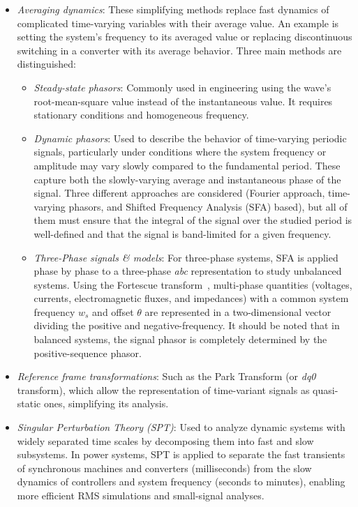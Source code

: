 \begin{itemize}
    \item \textit{Averaging dynamics}: These simplifying methods replace fast dynamics of complicated time-varying variables with their average value. 
    An example is setting the system's frequency to its averaged value or replacing discontinuous switching in a converter with its average behavior. 
    Three main methods are distinguished:
    \begin{itemize}
        \item \textit{Steady-state phasors}: Commonly used in engineering using the wave's root-mean-square value instead of the instantaneous value. 
        It requires stationary conditions and homogeneous frequency.
        \item \textit{Dynamic phasors}: Used to describe the behavior of time-varying periodic signals, particularly under conditions where the system frequency 
        or amplitude may vary slowly compared to the fundamental period. These capture both the slowly-varying average and instantaneous phase of the signal. 
        Three different approaches are considered (Fourier approach, time-varying phasors, and Shifted Frequency Analysis (SFA) based), 
        but all of them must ensure that the integral of the signal over the studied period is well-defined and that the signal is band-limited for a given frequency.
        \item \textit{Three-Phase signals \& models}: For three-phase systems, SFA is applied phase by phase to a three-phase \textit{abc} representation to study unbalanced systems. 
        Using the Fortescue transform~\cite{Fortescue}, multi-phase quantities (voltages, currents, electromagnetic fluxes, and impedances) with a common system frequency $w_s$ 
        and offset $\theta$ are represented in a two-dimensional vector dividing the positive and negative-frequency. 
        It should be noted that in balanced systems, the signal phasor is completely determined by the positive-sequence phasor.
    \end{itemize}

    \item \textit{Reference frame transformations}: Such as the Park Transform (or \textit{dq0} transform), which allow the representation of time-variant signals as quasi-static ones, simplifying its analysis.

    \item \textit{Singular Perturbation Theory (SPT)}: Used to analyze dynamic systems with widely separated time scales by decomposing them into fast and slow subsystems. 
    In power systems, SPT is applied to separate the fast transients of synchronous machines and converters (milliseconds) from the slow dynamics of controllers 
    and system frequency (seconds to minutes), enabling more efficient RMS simulations and small-signal analyses.
\end{itemize}

